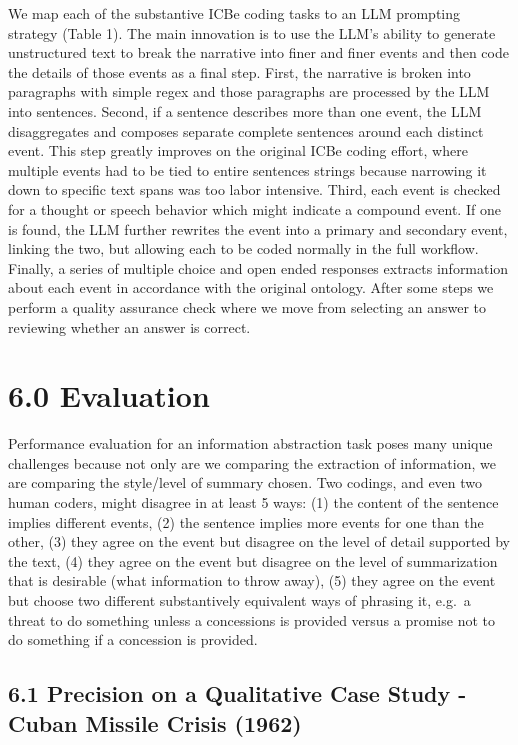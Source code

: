 \documentclass[
  letterpaper,
  DIV=11,
  numbers=noendperiod]{scrartcl}
\begin{document}
We map each of the substantive ICBe coding tasks to an LLM prompting
strategy (Table 1). The main innovation is to use the LLM's ability to
generate unstructured text to break the narrative into finer and finer
events and then code the details of those events as a final step. First,
the narrative is broken into paragraphs with simple regex and those
paragraphs are processed by the LLM into sentences. Second, if a
sentence describes more than one event, the LLM disaggregates and
composes separate complete sentences around each distinct event. This
step greatly improves on the original ICBe coding effort, where multiple
events had to be tied to entire sentences strings because narrowing it
down to specific text spans was too labor intensive. Third, each event
is checked for a thought or speech behavior which might indicate a
compound event. If one is found, the LLM further rewrites the event into
a primary and secondary event, linking the two, but allowing each to be
coded normally in the full workflow. Finally, a series of multiple
choice and open ended responses extracts information about each event in
accordance with the original ontology. After some steps we perform a
quality assurance check where we move from selecting an answer to
reviewing whether an answer is correct.

\hypertarget{evaluation}{%
\section{6.0 Evaluation}\label{evaluation}}

Performance evaluation for an information abstraction task poses many
unique challenges because not only are we comparing the extraction of
information, we are comparing the style/level of summary chosen. Two
codings, and even two human coders, might disagree in at least 5 ways:
(1) the content of the sentence implies different events, (2) the
sentence implies more events for one than the other, (3) they agree on
the event but disagree on the level of detail supported by the text, (4)
they agree on the event but disagree on the level of summarization that
is desirable (what information to throw away), (5) they agree on the
event but choose two different substantively equivalent ways of phrasing
it, e.g.~a threat to do something unless a concessions is provided
versus a promise not to do something if a concession is provided.

\hypertarget{precision-on-a-qualitative-case-study---cuban-missile-crisis-1962}{%
\subsection{6.1 Precision on a Qualitative Case Study - Cuban Missile
Crisis
(1962)}\label{precision-on-a-qualitative-case-study---cuban-missile-crisis-1962}}
\end{document}
